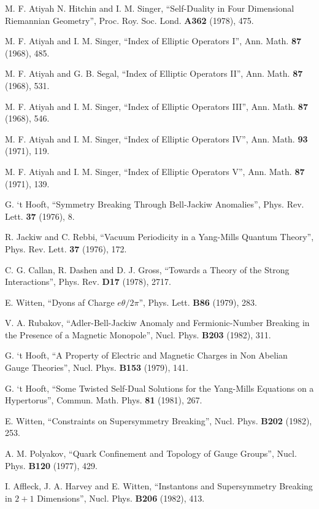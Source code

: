 \begin{thebibliography}{99}
  M. F. Atiyah N. Hitchin and I. M. Singer,
``Self-Duality in Four Dimensional Riemannian Geometry'', Proc. Roy. Soc. Lond. 
{\bf A362} (1978), 475.

 M. F. Atiyah and I. M. Singer, ``Index of Elliptic
Operators I'', Ann. Math. {\bf 87} (1968), 485.

M. F. Atiyah and G. B. Segal, ``Index of Elliptic
Operators II'', Ann. Math. {\bf 87} (1968), 531.

M. F. Atiyah and I. M. Singer, ``Index of Elliptic
Operators III'', Ann. Math. {\bf 87} (1968), 546.

M. F. Atiyah and I. M. Singer, ``Index of Elliptic
Operators IV'', Ann. Math. {\bf 93} (1971), 119.

M. F. Atiyah and I. M. Singer, ``Index of Elliptic
Operators V'', Ann. Math. {\bf 87} (1971), 139.

 G. `t Hooft, ``Symmetry Breaking Through 
Bell-Jackiw Anomalies'', Phys. Rev. Lett. {\bf 37} (1976), 8.

 R. Jackiw and C. Rebbi, ``Vacuum Periodicity in a Yang-Mills 
Quantum Theory'', Phys. Rev. Lett. {\bf 37} (1976), 172.

 C. G. Callan, R. Dashen and D. J. Gross, ``Towards
a Theory of the Strong Interactions'', Phys. Rev. {\bf D17} (1978), 2717.

 E. Witten, ``Dyons af Charge $e\theta/2 \pi$'',
Phys. Lett. {\bf B86} (1979), 283.

 V. A. Rubakov, ``Adler-Bell-Jackiw Anomaly and
Fermionic-Number Breaking in the Presence of a Magnetic
Monopole'', Nucl. Phys. {\bf B203} (1982), 311.

 G. `t Hooft, ``A Property of Electric and Magnetic Charges
in Non Abelian Gauge Theories'', Nucl. Phys. {\bf B153} (1979), 141.

 G. `t Hooft, ``Some Twisted Self-Dual Solutions for the 
Yang-Mills Equations on a Hypertorus'', Commun. Math. Phys. {\bf 81} (1981), 267.

 E. Witten, ``Constraints on Supersymmetry Breaking'', 
Nucl. Phys. {\bf B202} (1982), 253.

 A. M. Polyakov, ``Quark Confinement and Topology of
Gauge Groups'', Nucl. Phys. {\bf B120} (1977), 429.

 I. Affleck, J. A. Harvey and E. Witten, ``Instantons and 
Supersymmetry Breaking in $2+1$ Dimensions'', Nucl. Phys. {\bf B206} (1982), 413.


\end{thebibliography}
